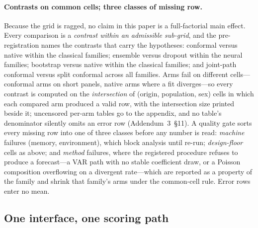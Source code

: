 \paragraph{Contrasts on common cells; three classes of missing row.}
Because the grid is ragged, no claim in this paper is a full-factorial main
effect. Every comparison is a \emph{contrast within an admissible
sub-grid}, and the pre-registration names the contrasts that carry the
hypotheses: conformal versus native within the classical families;
ensemble versus dropout within the neural families; bootstrap versus native
within the classical families; and joint-path conformal versus split
conformal across all families. Arms fail on different cells---conformal
arms on short panels, native arms where a fit diverges---so every contrast
is computed on the \emph{intersection} of (origin, population, sex) cells
in which each compared arm produced a valid row, with the intersection
size printed beside it; uncensored per-arm tables go to the appendix, and
no table's denominator silently omits an error row (Addendum~3~\S11). A
quality gate sorts every missing row into one of three classes before any
number is read: \emph{machine} failures (memory, environment), which block
analysis until re-run; \emph{design-floor} cells as above; and
\emph{method} failures, where the registered procedure refuses to produce a
forecast---a VAR path with no stable coefficient draw, or a Poisson
composition overflowing on a divergent rate---which are reported as a
property of the family and shrink that family's arms under the common-cell
rule. Error rows enter no mean.

\subsection{One interface, one scoring path}
\label{sec:design-interface}

